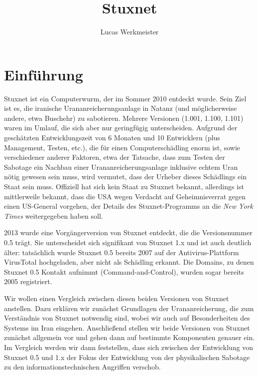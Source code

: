 \documentclass[a4paper]{article}
\title{Stuxnet}
\author{Lucas Werkmeister}
\begin{document}
\maketitle


\section{Einführung}

Stuxnet ist ein Computerwurm, der im Sommer 2010 entdeckt wurde.
Sein Ziel ist es, die iranische Urananreicherungsanlage in Natanz (und möglicherweise andere, etwa Buschehr) zu sabotieren.
Mehrere Versionen (1.001, 1.100, 1.101) waren im Umlauf, die sich aber nur geringfügig unterscheiden.
Aufgrund der geschätzten Entwicklungszeit von 6 Monaten und 10 Entwicklern (plus Management, Testen, etc.),
die für einen Computerschädling enorm ist, sowie verschiedener anderer Faktoren,
etwa der Tatsache, dass zum Testen der Sabotage ein Nachbau einer Urananreicherungsanlage inklusive echtem Uran nötig gewesen sein muss,
wird vermutet, dass der Urheber dieses Schädlings ein Staat sein muss.
Offiziell hat sich kein Staat zu Stuxnet bekannt,
allerdings ist mittlerweile bekannt, dass die USA wegen Verdacht auf Geheimnisverrat gegen einen US-General vorgehen,
der Details des Stuxnet-Programms an die \emph{New York Times} weitergegeben haben soll.\cite{wp:leak}

2013 wurde eine Vorgängerversion von Stuxnet entdeckt, die die Versionsnummer 0.5 trägt.
Sie unterscheidet sich signifikant von Stuxnet 1.x und ist auch deutlich älter:
tatsächlich wurde Stuxnet 0.5 bereits 2007 auf der Antivirus-Plattform VirusTotal hochgeladen, aber nicht als Schädling erkannt.
Die Domains, zu denen Stuxnet 0.5 Kontakt aufnimmt (Command-and-Control), wurden sogar bereits 2005 registriert.

Wir wollen einen Vergleich zwischen diesen beiden Versionen von Stuxnet anstellen.
Dazu erklären wir zunächst Grundlagen der Urananreicherung, die zum Verständnis von Stuxnet notwendig sind,
wobei wir auch auf Besonderheiten des Systems im Iran eingehen.
Anschließend stellen wir beide Versionen von Stuxnet zunächst allgemein vor und gehen dann auf bestimmte Komponenten genauer ein.
Im Vergleich werden wir dann feststellen, dass sich zwischen der Entwicklung von Stuxnet 0.5 und 1.x
der Fokus der Entwicklung von der physikalischen Sabotage zu den informationstechnischen Angriffen verschob.
\end{document}
